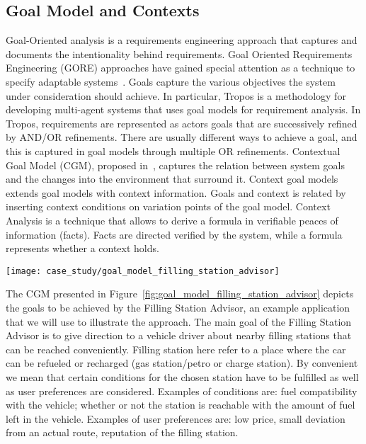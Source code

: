 
\subsection{Goal Model and Contexts}
Goal-Oriented analysis is a requirements engineering approach that captures and documents the intentionality behind requirements. Goal Oriented Requirements Engineering (GORE) approaches have gained special attention as a technique to specify adaptable systems~\cite{morandini_goal-oriented_2009}. Goals capture the various objectives the system under consideration should achieve. In particular, Tropos\cite{bresciani_tropos:_2004} is a methodology for developing multi-agent systems that uses goal models for requirement analysis. In Tropos, requirements are represented as actors goals that are successively refined by AND/OR refinements. There are usually different ways to achieve a goal, and this is captured in goal models through multiple OR refinements.
Contextual Goal Model (CGM), proposed in~\cite{ali_goal-based_2010}, captures the relation between system goals and the changes into the environment that surround it. Context goal models extends goal models with context information. Goals and context is related by inserting context conditions on variation points of the goal model. Context Analysis is a technique that allows to derive a formula in verifiable peaces of information (facts). Facts are directed verified by the system, while a formula represents whether a context holds.

\begin{figure*}[!htb]
 \centering
 \texttt{[image: case\_study/goal\_model\_filling\_station\_advisor]}
 \caption{CGM of the filling station advisor}
\label{fig:goal_model_filling_station_advisor}
\end{figure*}




The CGM presented in Figure~\ref{fig:goal_model_filling_station_advisor} depicts the goals to be achieved by the Filling Station Advisor, an example application that we will use to illustrate the approach.
The main goal of the Filling Station Advisor is to give direction to a vehicle driver about nearby filling stations that can be reached conveniently. Filling station here refer to a place where the car can be refueled or recharged (gas station/petro or charge station). By convenient we mean that certain conditions for the chosen station have to be fulfilled as well as user preferences are considered. Examples of conditions are: fuel compatibility with the vehicle; whether or not the station is reachable with the amount of fuel left in the vehicle. Examples of user preferences are: low price, small deviation from an actual route, reputation of the filling station.

